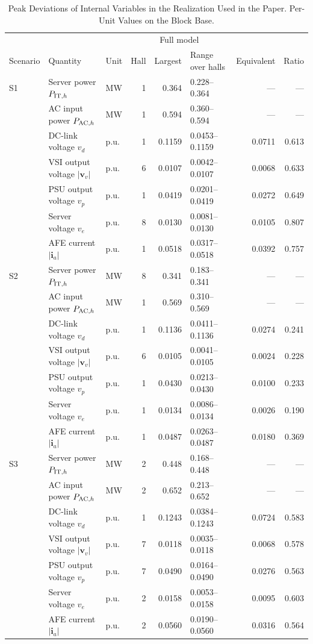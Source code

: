 \begin{table}[tbp]
\centering\small\setlength{\tabcolsep}{4.5pt}
\caption{Peak Deviations of Internal Variables in the Realization Used in the Paper.
Per-Unit Values on the Block Base.}
\label{tab:internal}
\begin{tabular}{lllrrlrr}\toprule
 & & & \multicolumn{3}{c}{Full model} & & \\
Scenario & Quantity & Unit & Hall & Largest & Range over halls & Equivalent & Ratio\\\midrule
S1 & Server power $P_{{\rm IT},h}$ & MW & 1 & 0.364 & 0.228--0.364 & --- & --- \\
 & AC input power $P_{{\rm AC},h}$ & MW & 1 & 0.594 & 0.360--0.594 & --- & --- \\
 & DC-link voltage $v_d$ & p.u. & 1 & 0.1159 & 0.0453--0.1159 & 0.0711 & 0.613 \\
 & VSI output voltage $|\bm v_v|$ & p.u. & 6 & 0.0107 & 0.0042--0.0107 & 0.0068 & 0.633 \\
 & PSU output voltage $v_p$ & p.u. & 1 & 0.0419 & 0.0201--0.0419 & 0.0272 & 0.649 \\
 & Server voltage $v_e$ & p.u. & 8 & 0.0130 & 0.0081--0.0130 & 0.0105 & 0.807 \\
 & AFE current $|\bm i_a|$ & p.u. & 1 & 0.0518 & 0.0317--0.0518 & 0.0392 & 0.757 \\
\midrule
S2 & Server power $P_{{\rm IT},h}$ & MW & 8 & 0.341 & 0.183--0.341 & --- & --- \\
 & AC input power $P_{{\rm AC},h}$ & MW & 1 & 0.569 & 0.310--0.569 & --- & --- \\
 & DC-link voltage $v_d$ & p.u. & 1 & 0.1136 & 0.0411--0.1136 & 0.0274 & 0.241 \\
 & VSI output voltage $|\bm v_v|$ & p.u. & 6 & 0.0105 & 0.0041--0.0105 & 0.0024 & 0.228 \\
 & PSU output voltage $v_p$ & p.u. & 1 & 0.0430 & 0.0213--0.0430 & 0.0100 & 0.233 \\
 & Server voltage $v_e$ & p.u. & 1 & 0.0134 & 0.0086--0.0134 & 0.0026 & 0.190 \\
 & AFE current $|\bm i_a|$ & p.u. & 1 & 0.0487 & 0.0263--0.0487 & 0.0180 & 0.369 \\
\midrule
S3 & Server power $P_{{\rm IT},h}$ & MW & 2 & 0.448 & 0.168--0.448 & --- & --- \\
 & AC input power $P_{{\rm AC},h}$ & MW & 2 & 0.652 & 0.213--0.652 & --- & --- \\
 & DC-link voltage $v_d$ & p.u. & 1 & 0.1243 & 0.0384--0.1243 & 0.0724 & 0.583 \\
 & VSI output voltage $|\bm v_v|$ & p.u. & 7 & 0.0118 & 0.0035--0.0118 & 0.0068 & 0.578 \\
 & PSU output voltage $v_p$ & p.u. & 7 & 0.0490 & 0.0164--0.0490 & 0.0276 & 0.563 \\
 & Server voltage $v_e$ & p.u. & 2 & 0.0158 & 0.0053--0.0158 & 0.0095 & 0.603 \\
 & AFE current $|\bm i_a|$ & p.u. & 2 & 0.0560 & 0.0190--0.0560 & 0.0316 & 0.564 \\
\bottomrule\end{tabular}\end{table}
